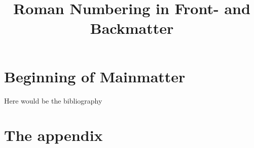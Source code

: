 \documentclass[11pt,a4paper,abstract,titlepage]{scrartcl}
\title{Roman Numbering in Front- and Backmatter}
\newcounter{roman-pagenumber}
\begin{document}
\maketitle
\begin{abstract}
    \lipsum{}
\end{abstract}

\tableofcontents
\setcounter{roman-pagenumber}{\value{page}} %

\clearpage
{} %
\section{Beginning of Mainmatter}
\lipsum{}


\clearpage
{} %

Here would be the bibliography\clearpage

\appendix
\section{The appendix}
\lipsum{}
\end{document}
